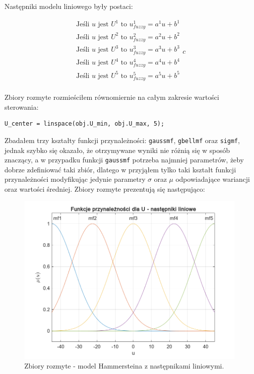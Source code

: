 Następniki modelu liniowego były postaci:

\begin{equation}
\begin{array}{c}
\text{Jeśli } u \text{ jest } U^1 \text{ to } u^1_{fuzzy}=a^1u+b^1 \\[1.5ex]
\text{Jeśli } u \text{ jest } U^2 \text{ to } u^2_{fuzzy}=a^2u+b^2 \\[1.5ex]
\text{Jeśli } u \text{ jest } U^3 \text{ to } u^3_{fuzzy}=a^3u+b^3 \\[1.5ex]
\text{Jeśli } u \text{ jest } U^4 \text{ to } u^4_{fuzzy}=a^4u+b^4 \\[1.5ex]
\text{Jeśli } u \text{ jest } U^5 \text{ to } u^5_{fuzzy}=a^5u+b^5 \\[1.5ex]
\end{array}{c}
\end{equation}

\newpage

Zbiory rozmyte rozmieściłem równomiernie na całym zakresie wartości sterowania:

\begin{lstlisting}[style=Matlab-editor]
U_center = linspace(obj.U_min, obj.U_max, 5);
\end{lstlisting}

\noindent Zbadałem trzy kształty funkcji przynależności: \verb+gaussmf+, \verb+gbellmf+ oraz \verb+sigmf+, jednak szybko się okazało, że otrzymywane wyniki nie różnią się w sposób znaczący, a w przypadku funkcji \verb+gaussmf+ potrzeba najmniej parametrów, żeby dobrze zdefiniować taki zbiór, dlatego w przyjąłem tylko taki kształt funkcji przynależności modyfikując jedynie parametry $\sigma$ oraz $\mu$ odpowiadające wariancji oraz wartości średniej. Zbiory rozmyte prezentują się następująco:

\begin{figure}[h!]
\centering
\includegraphics[width=\textwidth]{pictures/HammersteinfuzzySets_liniowe}
\caption{Zbiory rozmyte - model Hammersteina z następnikami liniowymi.}
\end{figure}

